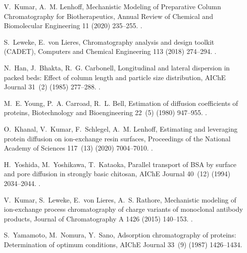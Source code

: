 \documentclass[preprint,review,12pt]{elsarticle}
\providecommand{\DIFaddtex}[1]{{\protect\color{blue}\uwave{#1}}} %
\providecommand{\DIFaddbegin}{} %
\providecommand{\DIFaddend}{} %
\providecommand{\DIFadd}[1]{\texorpdfstring{\DIFaddtex{#1}}{#1}} %
\begin{document}
\begin{thebibliography}{10}
V.~Kumar, A.~M. Lenhoff, {Mechanistic Modeling of Preparative Column
  Chromatography for Biotherapeutics}, Annual Review of Chemical and
  Biomolecular Engineering 11 (2020) 235--255.
\newblock \href {https://doi.org/10.1146/annurev-chembioeng-102419-125430}
  {}.

S.~Leweke, E.~von Lieres, {Chromatography analysis and design toolkit (CADET)},
  Computers and Chemical Engineering 113 (2018) 274--294.
\newblock \href {https://doi.org/10.1016/j.compchemeng.2018.02.025}
  {}.

N.~Han, J.~Bhakta, R.~G. Carbonell, {Longitudinal and lateral dispersion in
  packed beds: Effect of column length and particle size distribution}, AIChE
  Journal 31~(2) (1985) 277--288.
\newblock \href {https://doi.org/10.1002/aic.690310215}
  {}.

M.~E. Young, P.~A. Carroad, R.~L. Bell, {Estimation of diffusion coefficients
  of proteins}, Biotechnology and Bioengineering 22~(5) (1980) 947--955.
\newblock \href {https://doi.org/10.1002/bit.260220504}
  {}.

O.~Khanal, V.~Kumar, F.~Schlegel, A.~M. Lenhoff, Estimating and leveraging
  protein diffusion on ion-exchange resin surfaces, Proceedings of the National
  Academy of Sciences 117~(13) (2020) 7004--7010.
\newblock \href {https://doi.org/10.1073/pnas.1921499117}
  {}.

H.~Yoshida, M.~Yoshikawa, T.~Kataoka, {Parallel transport of BSA by surface and
  pore diffusion in strongly basic chitosan}, AIChE Journal 40~(12) (1994)
  2034--2044.
\newblock \href {https://doi.org/10.1002/aic.690401213}
  {}.

V.~Kumar, S.~Leweke, E.~von Lieres, A.~S. Rathore, {Mechanistic modeling of
  ion-exchange process chromatography of charge variants of monoclonal antibody
  products}, Journal of Chromatography A 1426 (2015) 140--153.
\newblock \href {https://doi.org/10.1016/j.chroma.2015.11.062}
  {}.

S.~Yamamoto, M.~Nomura, Y.~Sano, {Adsorption chromatography of proteins:
  Determination of optimum conditions}, AIChE Journal 33~(9) (1987) 1426--1434.
\DIFaddbegin \newblock \href {https://doi.org/10.1002/aic.690330903}
  {}\DIFadd{.
}\DIFaddend 


\end{thebibliography}
\end{document}

